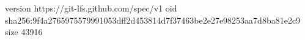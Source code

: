 version https://git-lfs.github.com/spec/v1
oid sha256:9f4a2765975579991053dff2d453814d7f37463be2e27e98253aa7d8ba81e2c9
size 43916
